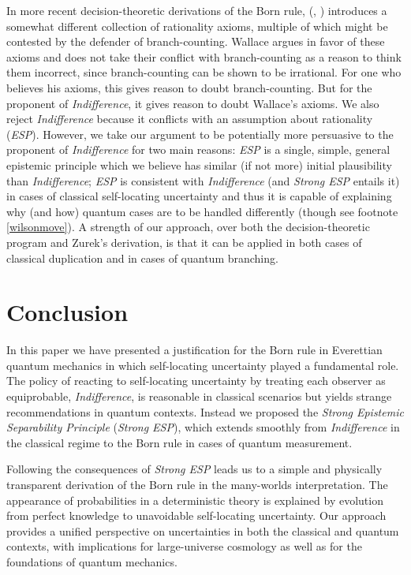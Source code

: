 \documentclass[12pt,onecolumn,secnumarabic,amsmath,amssymb,balancelastpage,nofootinbib]{article}
\begin{document}
In more recent decision-theoretic derivations of the Born rule, \citeauthor{wallace2010b} (\citeyear{wallace2010b}, \citeyear{wallace2012}) introduces a somewhat different collection of rationality axioms, multiple of which might be contested by the defender of branch-counting.  Wallace argues in favor of these axioms and does not take their conflict with branch-counting \citep[.1]{wallace2012} as a reason to think them incorrect, since branch-counting can be shown to be irrational.  For one who believes his axioms, this gives reason to doubt branch-counting.  But for the proponent of \emph{Indifference}, it gives reason to doubt Wallace's axioms. {We also reject \emph{Indifference} because it conflicts with an assumption about rationality (\emph{ESP}).  However, we take our argument to be potentially more persuasive to the proponent of \emph{Indifference} for two main reasons: \emph{ESP} is a single, simple, general epistemic principle which we believe has similar (if not more) initial plausibility than \emph{Indifference}; \emph{ESP} is consistent with \emph{Indifference} (and \emph{Strong ESP} entails it) in cases of classical self-locating uncertainty and thus it is capable of explaining why (and how) quantum cases are to be handled differently (though see footnote \ref{wilsonmove}).}  A strength of our approach, over both the decision-theoretic program and Zurek's derivation, is that it can be applied in both cases of classical duplication {and} in cases of quantum branching.

\section{Conclusion}

In this paper we have presented a justification for the Born rule in Everettian quantum mechanics in which self-locating uncertainty played a fundamental role. {The policy of reacting to self-locating uncertainty by treating each observer as equiprobable, \emph{Indifference}, is reasonable in classical scenarios but yields strange recommendations in quantum contexts.} Instead we proposed the \emph{Strong Epistemic Separability Principle} (\emph{Strong ESP}), which extends smoothly from \emph{Indifference} in the classical regime to the Born rule in cases of quantum measurement.

Following the consequences of \emph{Strong ESP} leads us to a simple and physically transparent derivation of the Born rule in the many-worlds interpretation. The appearance of probabilities in a deterministic theory is explained by evolution from perfect knowledge to unavoidable self-locating uncertainty. Our approach provides a unified perspective on uncertainties in both the classical and quantum contexts, with implications for large-universe cosmology as well as for the foundations of quantum mechanics.
\end{document}
